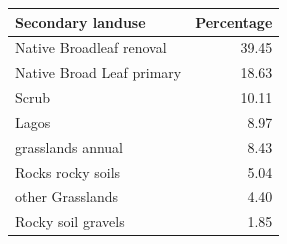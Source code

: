 \documentclass[]{article}
\begin{document}
\begin{table}[H]
\centering
\begin{tabular}{lr}
\toprule
Secondary landuse & Percentage\\
\midrule
Native Broadleaf renoval & 39.45\\
Native Broad Leaf primary & 18.63\\
Scrub & 10.11\\
Lagos & 8.97\\
grasslands annual & 8.43\\
\addlinespace
Rocks rocky soils & 5.04\\
other Grasslands & 4.40\\
Rocky soil gravels & 1.85\\
\bottomrule
\end{tabular}
\end{table}

\renewcommand\refname{References}

\end{document}
